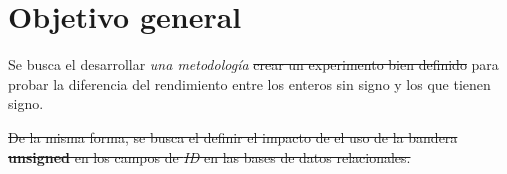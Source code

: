 \section{Objetivo general}

Se busca el desarrollar \textit{una metodología} \sout{crear un experimento bien definido} para probar la diferencia del rendimiento entre los enteros sin signo y los que tienen signo.

\sout{De la misma forma, se busca el definir el impacto de el uso de la bandera \textbf{unsigned} en los campos de \textit{ID} en las bases de datos relacionales.}

